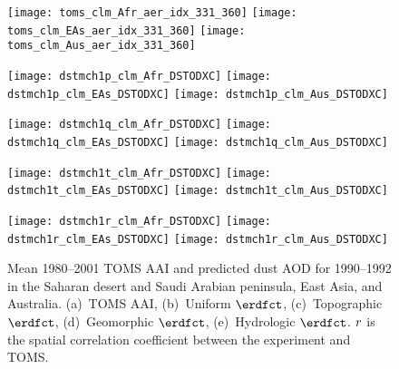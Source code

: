 \documentclass[final,dvips]{foils}
\begin{document}
\foilhead{\bgp
\Large\textcolor{blue}{\hfill Spatial Correlation \hfill}}\vspace{-0.5in}\large
\begin{figure}
\centering %
\texttt{[image: toms\_clm\_Afr\_aer\_idx\_331\_360]}%
\texttt{[image: toms\_clm\_EAs\_aer\_idx\_331\_360]}%
\texttt{[image: toms\_clm\_Aus\_aer\_idx\_331\_360]}%

\texttt{[image: dstmch1p\_clm\_Afr\_DSTODXC]}%
\texttt{[image: dstmch1p\_clm\_EAs\_DSTODXC]}%
\texttt{[image: dstmch1p\_clm\_Aus\_DSTODXC]}%

\texttt{[image: dstmch1q\_clm\_Afr\_DSTODXC]}%
\texttt{[image: dstmch1q\_clm\_EAs\_DSTODXC]}%
\texttt{[image: dstmch1q\_clm\_Aus\_DSTODXC]}%

\texttt{[image: dstmch1t\_clm\_Afr\_DSTODXC]}%
\texttt{[image: dstmch1t\_clm\_EAs\_DSTODXC]}%
\texttt{[image: dstmch1t\_clm\_Aus\_DSTODXC]}%

\texttt{[image: dstmch1r\_clm\_Afr\_DSTODXC]}%
\texttt{[image: dstmch1r\_clm\_EAs\_DSTODXC]}%
\texttt{[image: dstmch1r\_clm\_Aus\_DSTODXC]}%
\caption{
Mean 1980--2001 TOMS AAI and predicted dust AOD for 1990--1992 in the
Saharan desert and Saudi Arabian peninsula, East Asia, and Australia.
(a)~TOMS AAI, (b)~Uniform $\erdfct$, (c)~Topographic $\erdfct$, 
(d)~Geomorphic $\erdfct$, (e)~Hydrologic $\erdfct$.
$r$ is the spatial correlation coefficient between the
experiment and TOMS. 
\label{fgr:stt_odx}}
\end{figure}
\end{document}
